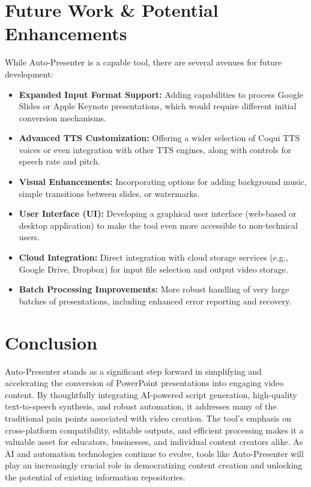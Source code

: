 \documentclass{article}
\begin{document}
\section{Future Work & Potential Enhancements}
While Auto-Presenter is a capable tool, there are several avenues for future development:
\begin{itemize}
    \item \textbf{Expanded Input Format Support:} Adding capabilities to process Google Slides or Apple Keynote presentations, which would require different initial conversion mechanisms.
    \item \textbf{Advanced TTS Customization:} Offering a wider selection of Coqui TTS voices or even integration with other TTS engines, along with controls for speech rate and pitch.
    \item \textbf{Visual Enhancements:} Incorporating options for adding background music, simple transitions between slides, or watermarks.
    \item \textbf{User Interface (UI):} Developing a graphical user interface (web-based or desktop application) to make the tool even more accessible to non-technical users.
    \item \textbf{Cloud Integration:} Direct integration with cloud storage services (e.g., Google Drive, Dropbox) for input file selection and output video storage.
    \item \textbf{Batch Processing Improvements:} More robust handling of very large batches of presentations, including enhanced error reporting and recovery.
\end{itemize}

\section{Conclusion}
Auto-Presenter stands as a significant step forward in simplifying and accelerating the conversion of PowerPoint presentations into engaging video content. By thoughtfully integrating AI-powered script generation, high-quality text-to-speech synthesis, and robust automation, it addresses many of the traditional pain points associated with video creation. The tool's emphasis on cross-platform compatibility, editable outputs, and efficient processing makes it a valuable asset for educators, businesses, and individual content creators alike. As AI and automation technologies continue to evolve, tools like Auto-Presenter will play an increasingly crucial role in democratizing content creation and unlocking the potential of existing information repositories.
\end{document}
